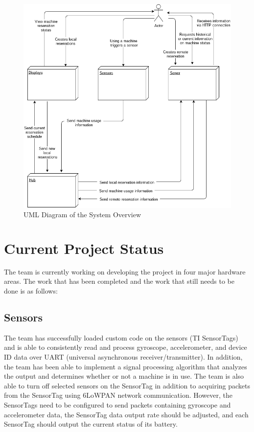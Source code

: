 \documentclass[letterpaper,11pt]{./templates/texMemo} %
\begin{document}
\begin{figure}[H]
    \centering
    \includegraphics[width=\textwidth]{uml/general_overview.png}
    \caption{UML Diagram of the System Overview}
    \label{fig:general_overview}
\end{figure}

\section{Current Project Status}	

The team is currently working on developing the project in four major hardware areas. The work that has been completed and the work that still needs to be done is as follows:

\subsection{Sensors}
The team has successfully loaded custom code on the sensors (TI SensorTags) and is able to consistently read and process gyroscope, accelerometer, and device ID data over UART (universal asynchronous receiver/transmitter). In addition, the team has been able to implement a signal processing algorithm that analyzes the output and determines whether or not a machine is in use. The team is also able to turn off selected sensors on the SensorTag in addition to acquiring packets from the SensorTag using 6LoWPAN network communication. However, the SensorTags need to be configured to send packets containing gyroscope and accelerometer data, the SensorTag data output rate should be adjusted, and each SensorTag should output the current status of its battery.
\end{document}
